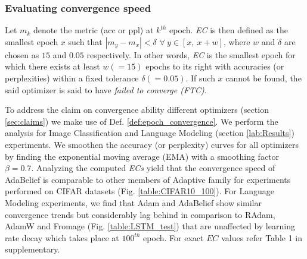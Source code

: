 \subsubsection{Evaluating convergence speed}
\label{lab:convergence_speed}
\begin{definition}
Let $m_k$ denote the metric (acc or ppl) at $k^{th}$ epoch. \textit{EC} is then defined as the smallest epoch $x$ such that $|m_y - m_x| < \delta$ $ \forall\ y \in [x,\ x + w]$, where $w$ and $\delta$ are chosen as $15$ and $0.05$ respectively. In other words, \textit{EC} is the smallest epoch for which there exists at least $w(=15)$ epochs to its right with accuracies (or perplexities) within a fixed tolerance $\delta(=0.05)$. If such $x$ cannot be found, the said optimizer is said to have \textit{failed to converge (FTC)}.
\label{def:epoch_convergence}
\end{definition}
To address the claim on convergence ability different optimizers (section \ref{sec:claims}) we make use of Def. \ref{def:epoch_convergence}. We perform the analysis for Image Classification and Language Modeling (section \ref{lab:Results}) experiments. We smoothen the accuracy (or perplexity) curves for all optimizers by finding the exponential moving average (EMA) with a smoothing factor $\beta=0.7$. Analyzing the computed \textit{ECs} yield that the convergence speed of AdaBelief is comparable to other members of Adaptive family for experiments performed on CIFAR datasets (Fig. \ref{table:CIFAR10_100}). For Language Modeling experiments, we find that Adam and AdaBelief show similar convergence trends but considerably lag behind in comparison to RAdam, AdamW and Fromage (Fig. \ref{table:LSTM_test}) that are unaffected by learning rate decay which takes place at $100^{th}$ epoch. For exact $EC$ values refer Table 1 in supplementary.

    

	
 

